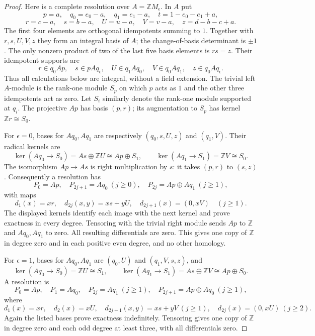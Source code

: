 \begin{proof}
Here is a complete resolution over $A=\mathbb ZM_\epsilon$.
In $A$ put
\[
 p=a,\quad q_0=e_0-a,\quad q_1=e_1-a,\quad
 t=1-e_0-e_1+a,
\]
\[
 r=c-a,\quad s=b-a,\quad U=u-a,\quad V=v-a,
 \quad z=d-b-c+a.
\]
The first four elements are orthogonal idempotents summing to $1$.
Together with $r,s,U,V,z$ they form an integral basis of $A$;
the change-of-basis determinant is $\pm1$.  The only nonzero
product of two of the last five basis elements is $rs=z$.
Their idempotent supports are
\[
 r\in q_0Ap,\quad s\in pAq_\epsilon,\quad
 U\in q_1Aq_0,\quad V\in q_0Aq_1,\quad
 z\in q_0Aq_\epsilon.
\]
Thus all calculations below are integral, without a field extension.
The trivial left $A$-module is the rank-one module $S_p$ on which
$p$ acts as $1$ and the other three idempotents act as zero.
Let $S_i$ similarly denote the rank-one module supported at $q_i$.
The projective $Ap$ has basis $(p,r)$; its augmentation to $S_p$
has kernel $\mathbb Zr\cong S_0$.

For $\epsilon=0$, bases for $Aq_0,Aq_1$ are respectively
$(q_0,s,U,z)$ and $(q_1,V)$.  Their radical kernels are
\[
 \ker(Aq_0\to S_0)=A s\oplus\mathbb ZU
                 \cong Ap\oplus S_1,
 \qquad \ker(Aq_1\to S_1)=\mathbb ZV\cong S_0.
\]
The isomorphism $Ap\to As$ is right multiplication by $s$:
it takes $(p,r)$ to $(s,z)$.  Consequently a resolution has
\[
 P_0=Ap,\quad P_{2j+1}=Aq_0\ (j\geq0),\quad
 P_{2j}=Ap\oplus Aq_1\ (j\geq1),
\]
with maps
\[
 d_1(x)=xr,\quad d_{2j}(x,y)=xs+yU,\quad
 d_{2j+1}(x)=(0,xV)\quad(j\geq1).
\]
The displayed kernels identify each image with the next kernel and
prove exactness in every degree.  Tensoring with the trivial right
module sends $Ap$ to $\mathbb Z$ and $Aq_0,Aq_1$ to zero.
All resulting differentials are zero.  This gives one copy of
$\mathbb Z$ in degree zero and in each positive even degree,
and no other homology.

For $\epsilon=1$, bases for $Aq_0,Aq_1$ are
$(q_0,U)$ and $(q_1,V,s,z)$, and
\[
 \ker(Aq_0\to S_0)=\mathbb ZU\cong S_1,\qquad
 \ker(Aq_1\to S_1)=As\oplus\mathbb ZV\cong Ap\oplus S_0.
\]
A resolution is
\[
 P_0=Ap,\quad P_1=Aq_0,\quad P_{2j}=Aq_1\ (j\geq1),
 \quad P_{2j+1}=Ap\oplus Aq_0\ (j\geq1),
\]
where
\[
 d_1(x)=xr,\quad d_2(x)=xU,\quad
 d_{2j+1}(x,y)=xs+yV\ (j\geq1),\quad
 d_{2j}(x)=(0,xU)\ (j\geq2).
\]
Again the listed bases prove exactness indefinitely.  Tensoring
gives one copy of $\mathbb Z$ in degree zero and each odd degree
at least three, with all differentials zero.


\end{proof}
